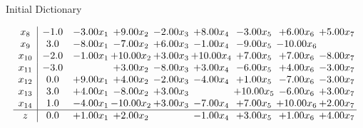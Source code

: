 \documentclass[8pt]{article}
\begin{document}
Initial Dictionary 

\[\begin{array}{c| c c@{\hskip 2pt} c@{\hskip 2pt} c@{\hskip 2pt} c@{\hskip 2pt} c@{\hskip 2pt} c@{\hskip 2pt} c@{\hskip 2pt} }
 x_{8}   &  -1.0 & -3.00 x_{1} & +  9.00 x_{2} & -2.00 x_{3} & +  8.00 x_{4} & -3.00 x_{5} & +  6.00 x_{6} & +  5.00 x_{7}\\
 x_{9}   &  3.0 & -8.00 x_{1} & -7.00 x_{2} & +  6.00 x_{3} & -1.00 x_{4} & -9.00 x_{5} & -10.00 x_{6} &   \\
 x_{10}   &  -2.0 & -1.00 x_{1} & + 10.00 x_{2} & +  3.00 x_{3} & + 10.00 x_{4} & +  7.00 x_{5} & +  7.00 x_{6} & -8.00 x_{7}\\
 x_{11}   &  -3.0  &   & +  3.00 x_{2} & -8.00 x_{3} & +  3.00 x_{4} & -6.00 x_{5} & +  4.00 x_{6} & -3.00 x_{7}\\
 x_{12}   &  0.0 & +  9.00 x_{1} & +  4.00 x_{2} & -2.00 x_{3} & -4.00 x_{4} & +  1.00 x_{5} & -7.00 x_{6} & -3.00 x_{7}\\
 x_{13}   &  3.0 & +  4.00 x_{1} & -8.00 x_{2} & +  3.00 x_{3} &   & + 10.00 x_{5} & -6.00 x_{6} & +  3.00 x_{7}\\
 x_{14}   &  1.0 & -4.00 x_{1} & -10.00 x_{2} & +  3.00 x_{3} & -7.00 x_{4} & +  7.00 x_{5} & + 10.00 x_{6} & +  2.00 x_{7}\\
\hline
z    &  0.0 & +  1.00 x_{1} & +  2.00 x_{2} &   & -1.00 x_{4} & +  3.00 x_{5} & +  1.00 x_{6} & +  4.00 x_{7}\\
\end{array}\]
\end{document}
